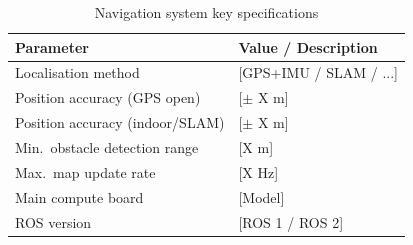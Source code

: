 \begin{table}[H]
    \centering
    \caption{Navigation system key specifications}
    \label{tab:nav_specs}
    \begin{tabular}{L{5cm} L{7cm}}
        \toprule
        \textbf{Parameter}               & \textbf{Value / Description} \\
        \midrule
        Localisation method              & [GPS+IMU / SLAM / ...] \\
        Position accuracy (GPS open)     & [$\pm$ X m] \\
        Position accuracy (indoor/SLAM)  & [$\pm$ X m] \\
        Min.\ obstacle detection range   & [X m] \\
        Max.\ map update rate            & [X Hz] \\
        Main compute board               & [Model] \\
        ROS version                      & [ROS 1 / ROS 2] \\
        \bottomrule
    \end{tabular}
\end{table}
